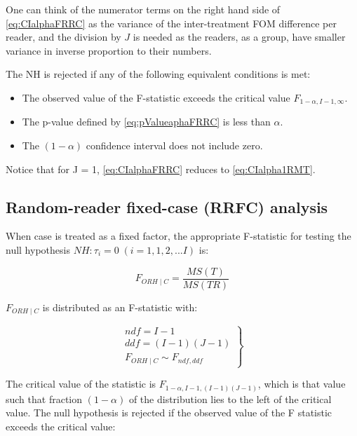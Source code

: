 \documentclass[
]{book}
\providecommand{\tightlist}{%
  \setlength{\itemsep}{0pt}\setlength{\parskip}{0pt}}
\begin{document}
One can think of the numerator terms on the right hand side of \eqref{eq:CIalphaFRRC} as the variance of the inter-treatment FOM difference per reader, and the division by \(J\) is needed as the readers, as a group, have smaller variance in inverse proportion to their numbers.

The NH is rejected if any of the following equivalent conditions is met:

\begin{itemize}
\tightlist
\item
  The observed value of the F-statistic exceeds the critical value \(F_{1-\alpha,I-1,\infty}\).
\item
  The p-value defined by \eqref{eq:pValueaphaFRRC} is less than \(\alpha\).
\item
  The \((1-\alpha)\) confidence interval does not include zero.
\end{itemize}

Notice that for J = 1, \eqref{eq:CIalphaFRRC} reduces to \eqref{eq:CIalpha1RMT}.

\hypertarget{random-reader-fixed-case-rrfc-analysis-1}{%
\subsection{Random-reader fixed-case (RRFC) analysis}\label{random-reader-fixed-case-rrfc-analysis-1}}

When case is treated as a fixed factor, the appropriate F-statistic for testing the null hypothesis \(NH: \tau_i = 0 \; (i=1,1,2,...I)\) is:

\begin{equation}
F_{ORH \mid C}=\frac{MS(T)}{MS(TR)}
\label{eq:DefFStatRRFC}
\end{equation}

\(F_{ORH \mid C}\) is distributed as an F-statistic with:

\begin{equation}
\left.\begin{matrix}
ndf=I-1\\ 
ddf=(I-1)(J-1)\\
F_{ORH \mid C} \sim F_{ndf,ddf}
\end{matrix}\right\}
\label{eq:FStatRRFC}
\end{equation}

The critical value of the statistic is \(F_{1-\alpha,I-1,(I-1)(J-1)}\), which is that value such that fraction \((1-\alpha)\) of the distribution lies to the left of the critical value. The null hypothesis is rejected if the observed value of the F statistic exceeds the critical value:
\end{document}

